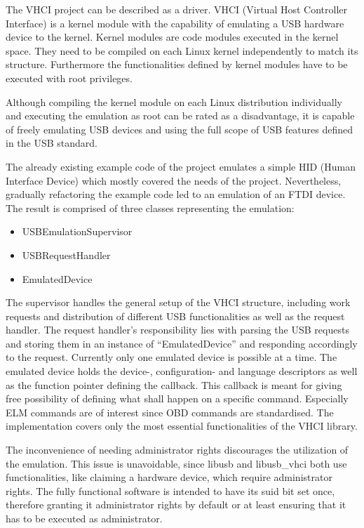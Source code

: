 The VHCI project can be described as a driver. VHCI (Virtual Host Controller Interface) is a kernel module with the capability of emulating a 
USB hardware device to the kernel. Kernel modules are code modules executed in the kernel space. They need to be compiled on each Linux kernel 
independently to match its structure. Furthermore the functionalities defined by kernel modules have to be executed with root privileges.

Although compiling the kernel module on each Linux distribution individually and executing the emulation as root can be rated as a disadvantage,
it is capable of freely emulating USB devices and using the full scope of USB features defined in the USB standard. 

The already existing example code of the project emulates a simple HID (Human Interface Device) which mostly covered the needs of the project. 
Nevertheless, gradually refactoring the example code led to an emulation of an FTDI device. The result is comprised of three classes 
representing the emulation:

\begin{itemize}
 \item USBEmulationSupervisor
 \item USBRequestHandler
 \item EmulatedDevice
\end{itemize}

The supervisor handles the general setup of the VHCI structure, including work requests and distribution of different USB functionalities as 
well as the request handler. The request handler’s responsibility lies with parsing the USB requests and storing them in an instance of 
“EmulatedDevice” and responding accordingly to the request. Currently only one emulated device is possible at a time. The emulated device holds 
the device-, configuration- and language descriptors as well as the function pointer defining the callback. This callback is meant for giving 
free possibility of defining what shall happen on a specific command. Especially ELM commands are of interest since OBD commands are 
standardised. The implementation covers only the most essential functionalities of the VHCI library.

The inconvenience of needing administrator rights discourages the utilization of the emulation. This issue is unavoidable, since libusb and 
libusb\_vhci both use functionalities, like claiming a hardware device, which require administrator rights. The fully functional software is 
intended to have its suid bit set once, therefore granting it administrator rights by default or at least ensuring that it has to be executed 
as administrator.

